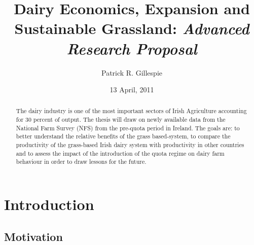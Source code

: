 \documentclass{report}
\title{Dairy Economics, Expansion and Sustainable Grassland: \emph{Advanced Research Proposal}}
\author{Patrick R. Gillespie}
\date{13 April, 2011}
\begin{document}
\maketitle
\begin{abstract}
The dairy industry is one of the most important sectors of Irish Agriculture accounting for 30 percent of output. The thesis will draw on newly available data from the National Farm Survey (NFS) from the pre-quota period in Ireland. The goals are: to better understand the relative benefits of the grass based-system, to compare the productivity of the grass-based Irish dairy system with productivity in other countries and to assess the impact of the introduction of the quota regime on dairy farm behaviour in order to draw lessons for the future.
\end{abstract}


\chapter{Introduction}

\section{Motivation}


%
%
%
%
\end{document}
